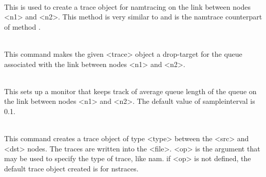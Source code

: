 \begin{flushleft}
\\
This is used to create a trace object for namtracing on the link between
nodes <n1> and <n2>. This method is very similar to and is the namtrace
counterpart of method .


\\
This command makes the given <trace> object a drop-target for the queue
associated with the link between nodes <n1> and <n2>.


\\
This sets up a monitor that keeps track of average queue length of the queue
on the link between nodes <n1> and <n2>. The default value of
sampleinterval is 0.1. 


\\
This command creates a trace object of type <type> between the <src> and
<dst> nodes. The traces are written into the <file>. <op> is the argument
that may be used to specify the type of trace, like nam. if <op> is not
defined, the default trace object created is for nstraces.
\end{flushleft}

\endinput
